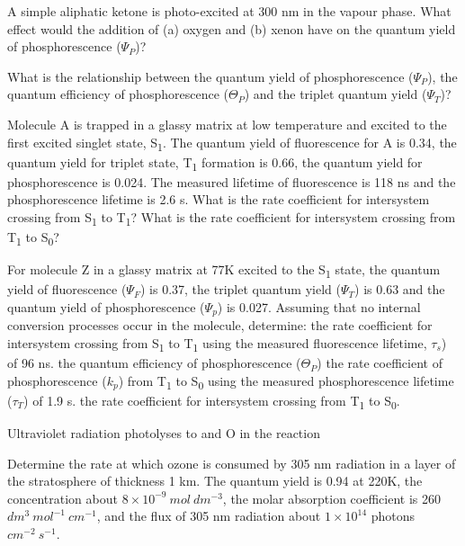 \documentclass[ignorenonframetext]{beamer}
\begin{document}
\begin{ExerciseList}
\Exercise A simple aliphatic ketone is photo-excited at 300 nm in the vapour phase. What effect would the addition of (a) oxygen and (b) xenon have on the quantum yield of phosphorescence (\(\Psi_P\))?

\Exercise What is the relationship between the quantum yield of phosphorescence (\(\Psi_P\)), the quantum efficiency of phosphorescence (\(\Theta_P\)) and the triplet quantum yield (\(\Psi_T\))?

\Exercise Molecule A is trapped in a glassy matrix at low temperature and excited to the first excited singlet state, S\textsubscript{1}. The quantum yield of fluorescence for A is 0.34, the quantum yield for triplet state, T\textsubscript{1} formation is 0.66, the quantum yield for phosphorescence is 0.024. The measured lifetime of fluorescence is 118 ns and the phosphorescence lifetime is 2.6 s.
\Question What is the rate coefficient for intersystem crossing from S\textsubscript{1} to T\textsubscript{1}?
\Question What is the rate coefficient for intersystem crossing from T\textsubscript{1} to S\textsubscript{0}?

\Exercise For molecule Z in a glassy matrix at 77K excited to the S\textsubscript{1} state, the quantum yield of fluorescence (\(\Psi_F\)) is 0.37, the triplet quantum yield (\(\Psi_T\)) is 0.63 and the quantum yield of phosphorescence (\(\Psi_p\)) is 0.027. Assuming that no internal conversion processes occur in the molecule, determine:
\Question the rate coefficient for intersystem crossing from S\textsubscript{1} to T\textsubscript{1} using the measured fluorescence lifetime, \(\tau_s\)) of 96 ns.
\Question the quantum efficiency of phosphorescence (\(\Theta_P\))
\Question the rate coefficient of phosphorescence (\(k_p\)) from T\textsubscript{1} to S\textsubscript{0} using the measured phosphorescence lifetime (\(\tau_T\)) of 1.9 s.
\Question the rate coefficient for intersystem crossing from T\textsubscript{1} to S\textsubscript{0}.

\end{ExerciseList}

\begin{Exercise}[label = ex1]
Ultraviolet radiation photolyses  to  and O in the reaction 

Determine the rate at which ozone is consumed by 305 nm radiation in a layer of the stratosphere of thickness 1 km. The quantum yield is 0.94 at 220K, the concentration about \(8\times10^{-9}\ mol\ dm^{-3}\), the molar absorption coefficient is 260 \(dm^3\ mol^{-1}\ cm^{-1}\), and the flux of 305 nm radiation about \(1\times 10^{14}\) photons \(cm^{-2}\ s^{-1}\).

\end{Exercise}
\end{document}

